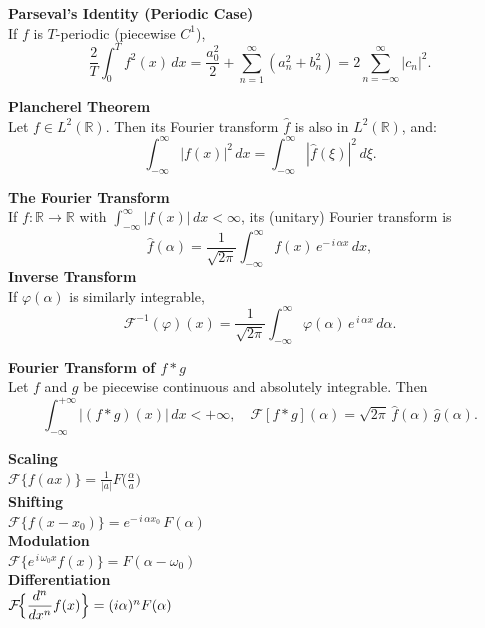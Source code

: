 \documentclass[8pt]{article}
\begin{document}
\begin{multicols}{2}
\noindent \textbf{Parseval's Identity (Periodic Case)}\\
If $f$ is $T$-periodic (piecewise $C^1$),
\[
  \frac{2}{T}\int_{0}^{T} f^{2}(x)\,dx
  = \frac{a_{0}^{2}}{2} + \sum_{n=1}^{\infty}(a_{n}^{2}+b_{n}^{2})
  = 2\sum_{n=-\infty}^{\infty}\!\!\bigl|c_{n}\bigr|^{2}.
\]

\noindent \textbf{Plancherel Theorem}\\
Let $f \in L^2(\mathbb{R})$. Then its Fourier transform $\hat{f}$ is also in $L^2(\mathbb{R})$, and:
\[
  \int_{-\infty}^\infty |f(x)|^2 \, dx
  = \int_{-\infty}^\infty |\hat{f}(\xi)|^2 \, d\xi.
\]

\noindent \textbf{The Fourier Transform}\\
If $f:\mathbb{R}\to\mathbb{R}$ with $\int_{-\infty}^{\infty}\!|f(x)|\,dx<\infty$, its (unitary) Fourier transform is
\[
  \widehat{f}(\alpha)=\frac{1}{\sqrt{2\pi}}
  \int_{-\infty}^{\infty} f(x)\, e^{-\,i\,\alpha x}\,dx,
\]
\noindent \textbf{Inverse Transform}\\
If $\varphi(\alpha)$ is similarly integrable,
\[
  \mathcal{F}^{-1}(\varphi)(x)= \frac{1}{\sqrt{2\pi}}
  \int_{-\infty}^{\infty}\!\varphi(\alpha)\,e^{\,i\,\alpha x}\,d\alpha.
\]

\noindent \textbf{Fourier Transform of \(f * g\)}\\
Let \(f\) and \(g\) be piecewise continuous and absolutely integrable. Then
\[
  \int_{-\infty}^{+\infty} |(f * g)(x)|\,dx < +\infty,\quad
  \mathcal{F}[f * g](\alpha)
  = \sqrt{2\pi} \,\hat{f}(\alpha)\,\hat{g}(\alpha).
\]
\vspace*{-15px}
\setlength{\columnsep}{-35pt} %
\begin{multicols}{2}
    \small
    \textbf{Scaling} \\
    $\mathcal{F}\{f(ax)\} = \frac{1}{|a|} F\!\bigl(\tfrac{\alpha}{a}\bigr)$\\
    \textbf{Shifting} \\
    $\mathcal{F}\{f(x - x_0)\} = e^{-\,i\,\alpha x_0}\,F(\alpha)$\\
    \textbf{Modulation} \\
    $\mathcal{F}\{e^{\,i\,\omega_0 x} f(x)\} = F(\alpha - \omega_0)$\\
    \textbf{Differentiation} \\
    $\mathcal{F}\!\Bigl\{\dfrac{d^n}{dx^n}f(x)\Bigr\}
        = (i \alpha)^n F(\alpha)$\\


    \columnbreak


\end{multicols}
\end{multicols}
\end{document}
